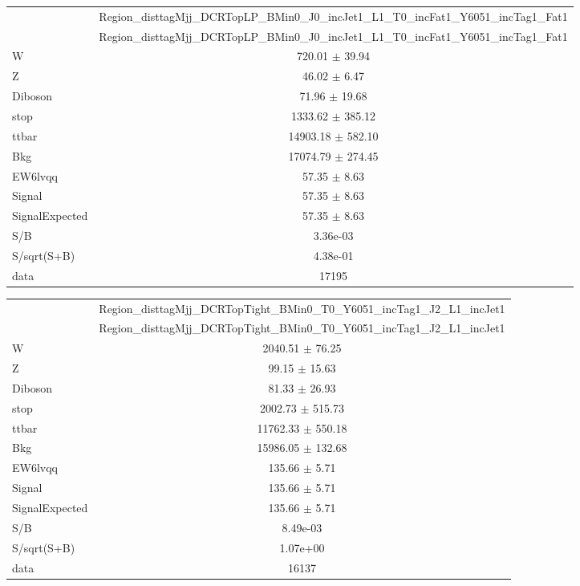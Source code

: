 \documentclass{article}
\begin{document}
\begin{table}
\centering
\small
\begin{tabular}{l|c|}
\cline{2-2}
 & \multicolumn{1}{c|}{Region\_disttagMjj\_DCRTopLP\_BMin0\_J0\_incJet1\_L1\_T0\_incFat1\_Y6051\_incTag1\_Fat1}\\
\cline{2-2}
 & \multicolumn{1}{c|}{Region\_disttagMjj\_DCRTopLP\_BMin0\_J0\_incJet1\_L1\_T0\_incFat1\_Y6051\_incTag1\_Fat1}\\ \hline
W & 720.01 $\pm$ 39.94\\
Z & 46.02 $\pm$ 6.47\\
Diboson & 71.96 $\pm$ 19.68\\
stop & 1333.62 $\pm$ 385.12\\
ttbar & 14903.18 $\pm$ 582.10\\
\hline
Bkg & 17074.79 $\pm$ 274.45\\
\hline
EW6lvqq & 57.35 $\pm$ 8.63\\
\hline
Signal & 57.35 $\pm$ 8.63\\
SignalExpected & 57.35 $\pm$ 8.63\\
\hline
S/B & 3.36e-03\\
S/sqrt(S+B) & 4.38e-01\\
\hline
data & 17195\\ \hline
\end{tabular}
\end{table}


\clearpage


\begin{table}
\centering
\small
\begin{tabular}{l|c|}
\cline{2-2}
 & \multicolumn{1}{c|}{Region\_disttagMjj\_DCRTopTight\_BMin0\_T0\_Y6051\_incTag1\_J2\_L1\_incJet1}\\
\cline{2-2}
 & \multicolumn{1}{c|}{Region\_disttagMjj\_DCRTopTight\_BMin0\_T0\_Y6051\_incTag1\_J2\_L1\_incJet1}\\ \hline
W & 2040.51 $\pm$ 76.25\\
Z & 99.15 $\pm$ 15.63\\
Diboson & 81.33 $\pm$ 26.93\\
stop & 2002.73 $\pm$ 515.73\\
ttbar & 11762.33 $\pm$ 550.18\\
\hline
Bkg & 15986.05 $\pm$ 132.68\\
\hline
EW6lvqq & 135.66 $\pm$ 5.71\\
\hline
Signal & 135.66 $\pm$ 5.71\\
SignalExpected & 135.66 $\pm$ 5.71\\
\hline
S/B & 8.49e-03\\
S/sqrt(S+B) & 1.07e+00\\
\hline
data & 16137\\ \hline
\end{tabular}
\end{table}
\end{document}

